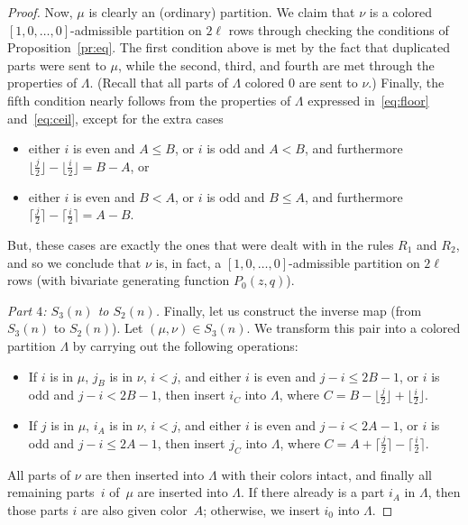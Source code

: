 \documentclass[pdftex]{sigma}
\numberwithin{equation}{section}
\theoremstyle{definition}
\begin{document}
\begin{proof}
Now, $\mu$ is clearly an (ordinary) partition. We claim that $\nu$ is a colored $[1,0,\dots,0]$-admissible partition on $2\ell$ rows through checking the conditions of Proposition~\ref{pr:eq}. The first condition above is met by the fact that duplicated parts were sent to $\mu$, while the second, third, and fourth are met through the properties of $\Lambda$. (Recall that all parts of $\Lambda$ colored 0 are sent to $\nu$.) Finally, the fifth condition nearly follows from the properties of $\Lambda$ expressed in~\eqref{eq:floor} and~\eqref{eq:ceil}, except for the extra cases
\begin{itemize}\itemsep=0pt
\item either $i$ is even and $A \le B$, or $i$ is odd and $A < B$, and furthermore $ \bigl\lfloor\frac j2\bigr\rfloor-\bigl\lfloor\frac i2\bigr\rfloor= B-A$, or
\item either $i$ is even and $B< A$, or $i$ is odd and $B\le A$, and furthermore
$\bigl\lceil\frac j2\bigr\rceil-\bigl\lceil\frac i2\bigr\rceil= A-B$.
\end{itemize}
But, these cases are exactly the ones that were dealt with in the rules $R_1$ and $R_2$, and so we conclude that $\nu$ is, in fact, a $[1,0,\dots,0]$-admissible partition on $2\ell$ rows (with bivariate generating function $P_0(z,q)$).

{\it Part $4$: $S_3(n)$ to $S_2(n)$.} Finally, let us construct the inverse map (from $S_3(n)$ to $S_2(n)$). Let $(\mu,\nu) \in S_3(n)$. We transform this pair into a colored partition $\Lambda$ by carrying out the following operations:
\begin{itemize}\itemsep=0pt
\item[$(R_1')$] If $i$ is in $\mu$, $j_B$ is in $\nu$, $i<j$, and either $i$ is even and $j-i\le2B-1$, or $i$ is odd and $j-i<2B-1$, then insert $i_C$ into $\Lambda$, where $C=B-\bigl\lfloor\frac j2\bigr\rfloor+\bigl\lfloor\frac i2\bigr\rfloor$.
\item[$(R_2')$] If $j$ is in $\mu$, $i_A$ is in $\nu$, $i<j$, and either $i$ is even and $j-i<2A-1$, or $i$ is odd and $j-i\le 2A-1$, then insert $j_C$ into $\Lambda$, where $ C=A+\bigl\lceil\frac j2\bigr\rceil-\bigl\lceil\frac i2\bigr\rceil$.
\end{itemize}
All parts of $\nu$ are then inserted into $\Lambda$ with their colors intact, and finally all remaining parts~$i$ of~$\mu$ are inserted into $\Lambda$. If there already is a part $i_A$ in $\Lambda$, then those parts $i$ are also given color~$A$; otherwise, we insert $i_0$ into $\Lambda$.


\end{proof}
\end{document}
